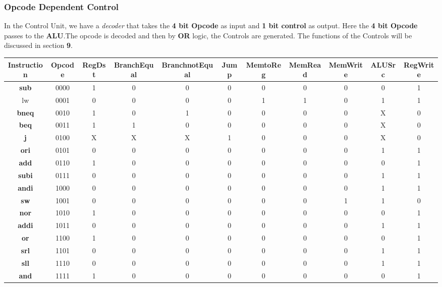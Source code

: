 \documentclass[12pt]{article}
\begin{document}
\subsubsection{Opcode Dependent Control}
In the Control Unit, we have a \textit{decoder} that takes the \textbf{4 bit Opcode} as input and \textbf{1 bit control} as output. Here the \textbf{4 bit Opcode} passes to the \textbf{ALU}.The opcode is decoded and then by \textbf{OR} logic, the Controls are generated. The functions of the Controls will be discussed in section \textbf{9}.
\begin{table}[H]
    \centering
    \begin{adjustbox}{width=\textwidth}
        \begin{tabular}{|c|c|c|c|c|c|c|c|c|c|c|}
            \hline
            \textbf{Instruction} & \textbf{Opcode} &  \textbf{RegDst} & \textbf{BranchEqual} & \textbf{BranchnotEqual} & \textbf{Jump} & \textbf{MemtoReg} & \textbf{MemRead} & \textbf{MemWrite} & \textbf{ALUSrc} & \textbf{RegWrite}\\
            \hline 
            \textbf{sub} & 0000 & 1 & 0 & 0 & 0 & 0 & 0 & 0 & 0 & 1 \\
            \hline
            \textbf{}lw & 0001 & 0 & 0 & 0 & 0 & 1 & 1 & 0 & 1 & 1 \\
            \hline
            \textbf{bneq} & 0010 & 1 & 0 & 1 & 0 & 0 & 0 & 0 & X & 0 \\
            \hline
            \textbf{beq} & 0011 & 1 & 1 & 0 & 0 & 0 & 0 & 0 & X & 0 \\
            \hline
            \textbf{j} & 0100 & X & X & X & 1 & 0 & 0 & 0 & X & 0 \\
            \hline
            \textbf{ori} & 0101 & 0 & 0 & 0 & 0 & 0 & 0 & 0 & 1 & 1 \\
            \hline
            \textbf{add} & 0110 & 1 & 0 & 0 & 0 & 0 & 0 & 0 & 0 & 1 \\
            \hline
            \textbf{subi} & 0111 & 0 & 0 & 0 & 0 & 0 & 0 & 0 & 1 & 1 \\
            \hline
            \textbf{andi} & 1000 & 0 & 0 & 0 & 0 & 0 & 0 & 0 & 1 & 1 \\
            \hline
            \textbf{sw} & 1001 & 0 & 0 & 0 & 0 & 0 & 0 & 1 & 1 & 0 \\
            \hline
            \textbf{nor} & 1010 & 1 & 0 & 0 & 0 & 0 & 0 & 0 & 0 & 1 \\
            \hline
            \textbf{addi} & 1011 & 0 & 0 & 0 & 0 & 0 & 0 & 0 & 1 & 1 \\
            \hline
            \textbf{or} & 1100 & 1 & 0 & 0 & 0 & 0 & 0 & 0 & 0 & 1 \\
            \hline
            \textbf{srl} & 1101 & 0 & 0 & 0 & 0 & 0 & 0 & 0 & 1 & 1 \\
            \hline
            \textbf{sll} & 1110 & 0 & 0 & 0 & 0 & 0 & 0 & 0 & 1 & 1 \\
            \hline
            \textbf{and} & 1111 & 1 & 0 & 0 & 0 & 0 & 0 & 0 & 0 & 1 \\
            \hline
            

\end{tabular}
\end{adjustbox}
\end{table}
\end{document}
